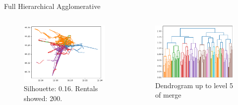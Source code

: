 \documentclass{beamer}
\begin{document}
\begin{frame}{Full Hierarchical Agglomerative}
\begin{columns}[t, onlytextwidth]
	\begin{figure}[bt]
		\centering
		\includegraphics[width=\textwidth]{full-agglomerative-plot}
		\caption{Silhouette: 0.16. Rentals showed: 200.}
		\label{fig:full-agglomerative-line}
	\end{figure}
	\begin{figure}[bt]
		\centering
		\includegraphics[width=\textwidth]{full-agglomerative-dendrogram}
		\caption{Dendrogram up to level 5 of merge}
		\label{fig:full-agglomerative-dendrogram}
	\end{figure}
\end{columns}
\end{frame}
\end{document}

